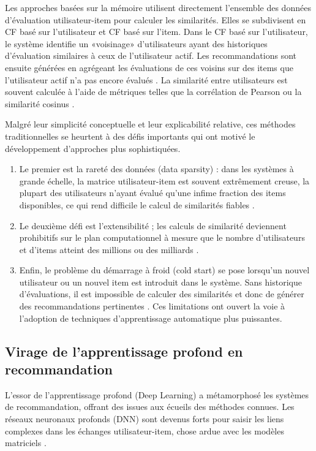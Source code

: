 Les approches basées sur la mémoire utilisent directement l'ensemble des données d'évaluation utilisateur-item pour calculer les similarités. Elles se subdivisent en CF basé sur l'utilisateur et CF basé sur l'item. Dans le CF basé sur l'utilisateur, le système identifie un «voisinage» d'utilisateurs ayant des historiques d'évaluation similaires à ceux de l'utilisateur actif. Les recommandations sont ensuite générées en agrégeant les évaluations de ces voisins sur des items que l'utilisateur actif n'a pas encore évalués \citet{Herlocker2004}. La similarité entre utilisateurs est souvent calculée à l'aide de métriques telles que la corrélation de Pearson ou la similarité cosinus \citet{Breese1998}.

Malgré leur simplicité conceptuelle et leur explicabilité relative, ces méthodes traditionnelles se heurtent à des défis importants qui ont motivé le développement d'approches plus sophistiquées. 
\begin{enumerate}
    \item Le premier est la rareté des données (data sparsity) : dans les systèmes à grande échelle, la matrice utilisateur-item est souvent extrêmement creuse, la plupart des utilisateurs n'ayant évalué qu'une infime fraction des items disponibles, ce qui rend difficile le calcul de similarités fiables \citep{Sarwar2001, Isinkaye2015}.
    \item Le deuxième défi est l'extensibilité ; les calculs de similarité deviennent prohibitifs sur le plan computationnel à mesure que le nombre d'utilisateurs et d'items atteint des millions ou des milliards \citep{Linden2003}.
    \vspace{1em}
    \item Enfin, le problème du démarrage à froid (cold start) se pose lorsqu'un nouvel utilisateur ou un nouvel item est introduit dans le système. Sans historique d'évaluations, il est impossible de calculer des similarités et donc de générer des recommandations pertinentes \citep{Schein2002, Lika2014}. Ces limitations ont ouvert la voie à l'adoption de techniques d'apprentissage automatique plus puissantes.
\end{enumerate}
\subsection{Virage de l'apprentissage profond en recommandation}

L'essor de l'apprentissage profond (Deep Learning) a métamorphosé les systèmes de recommandation, offrant des issues aux écueils des méthodes connues. Les réseaux neuronaux profonds (DNN) sont devenus forts pour saisir les liens complexes dans les échanges utilisateur-item, chose ardue avec les modèles matriciels \citep{He2017, Covington2016}. 

